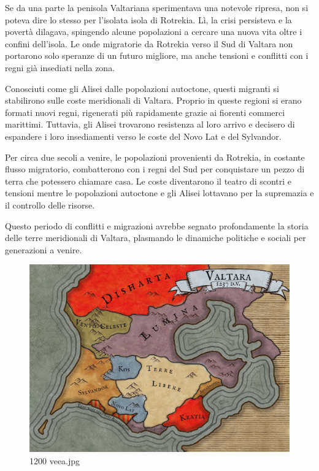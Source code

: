 Se da una parte la penisola Valtariana sperimentava una notevole
ripresa, non si poteva dire lo stesso per l'isolata isola di Rotrekia.
Lì, la crisi persisteva e la povertà dilagava, spingendo alcune
popolazioni a cercare una nuova vita oltre i confini dell'isola. Le onde
migratorie da Rotrekia verso il Sud di Valtara non portarono solo
speranze di un futuro migliore, ma anche tensioni e conflitti con i
regni già insediati nella zona.

Conosciuti come gli Alisei dalle popolazioni autoctone, questi migranti
si stabilirono sulle coste meridionali di Valtara. Proprio in queste
regioni si erano formati nuovi regni, rigenerati più rapidamente grazie
ai fiorenti commerci marittimi. Tuttavia, gli Alisei trovarono
resistenza al loro arrivo e decisero di espandere i loro insediamenti
verso le coste del Novo Lat e del Sylvandor.

Per circa due secoli a venire, le popolazioni provenienti da Rotrekia,
in costante flusso migratorio, combatterono con i regni del Sud per
conquistare un pezzo di terra che potessero chiamare casa. Le coste
diventarono il teatro di scontri e tensioni mentre le popolazioni
autoctone e gli Alisei lottavano per la supremazia e il controllo delle
risorse.

Questo periodo di conflitti e migrazioni avrebbe segnato profondamente
la storia delle terre meridionali di Valtara, plasmando le dinamiche
politiche e sociali per generazioni a venire.

\begin{figure}
\centering
\includegraphics{1200_veea.jpg}
\caption{1200 veea.jpg}
\end{figure}


